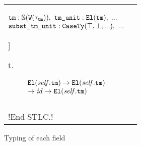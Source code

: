 \begin{figure}
\begin{tabular}{@{}lL@{\ }@{}}
{{\begin{minipage}{.35\textwidth}
        \vspace{-3.5pt}
    \begin{gather*}
    \begin{array}{@{}l@{}}
        \texttt{tm} : \TyS{\wcode{\wsig_{\texttt{tm}}}},\ 
        \texttt{tm\_unit} : \El{\texttt{tm}},\ 
        \dadada
        \\
        \texttt{subst\_tm\_unit} : \CaseSig{\top}{\bot}{\dadada},\ 
        \dadada
    \end{array}
    \end{gather*}
    \end{minipage}
    }\right]
}{
    \lambda t.\,
}{
    \begin{minipage}{.20\textwidth}%
        \vspace{-3.5pt}\scriptsize
    \begin{gather*}
    \begin{array}{@{}l@{}}
        \El{\mathit{self}.\texttt{tm}} \to \El{\mathit{self}.\texttt{tm}}
        \\
        \to \mathit{id} \to \El{\mathit{self}.\texttt{tm}}
    \end{array}
    \end{gather*}
    \end{minipage}
}
\\
\dadada
\\[4pt]
\lsti!End STLC.!
&
\end{tabular}

\caption{Typing of each field}
\label{fig:stlc-linkage-typing}
\end{figure}

